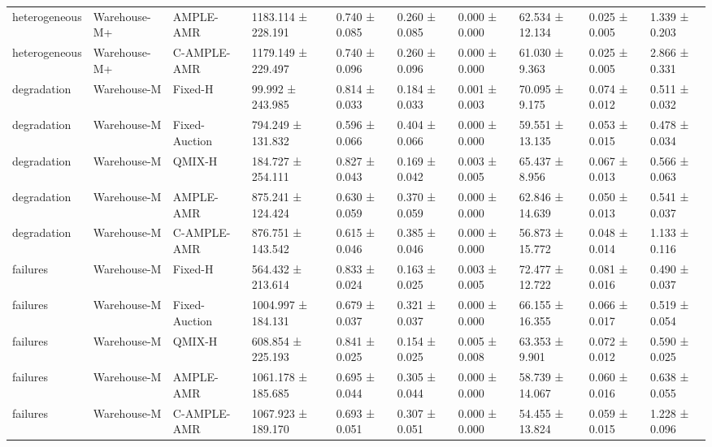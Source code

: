 \begin{tabular}{llllllllll}
heterogeneous & Warehouse-M+ & AMPLE-AMR & 1183.114 ± 228.191 & 0.740 ± 0.085 & 0.260 ± 0.085 & 0.000 ± 0.000 & 62.534 ± 12.134 & 0.025 ± 0.005 & 1.339 ± 0.203 \\
heterogeneous & Warehouse-M+ & C-AMPLE-AMR & 1179.149 ± 229.497 & 0.740 ± 0.096 & 0.260 ± 0.096 & 0.000 ± 0.000 & 61.030 ± 9.363 & 0.025 ± 0.005 & 2.866 ± 0.331 \\
degradation & Warehouse-M & Fixed-H & 99.992 ± 243.985 & 0.814 ± 0.033 & 0.184 ± 0.033 & 0.001 ± 0.003 & 70.095 ± 9.175 & 0.074 ± 0.012 & 0.511 ± 0.032 \\
degradation & Warehouse-M & Fixed-Auction & 794.249 ± 131.832 & 0.596 ± 0.066 & 0.404 ± 0.066 & 0.000 ± 0.000 & 59.551 ± 13.135 & 0.053 ± 0.015 & 0.478 ± 0.034 \\
degradation & Warehouse-M & QMIX-H & 184.727 ± 254.111 & 0.827 ± 0.043 & 0.169 ± 0.042 & 0.003 ± 0.005 & 65.437 ± 8.956 & 0.067 ± 0.013 & 0.566 ± 0.063 \\
degradation & Warehouse-M & AMPLE-AMR & 875.241 ± 124.424 & 0.630 ± 0.059 & 0.370 ± 0.059 & 0.000 ± 0.000 & 62.846 ± 14.639 & 0.050 ± 0.013 & 0.541 ± 0.037 \\
degradation & Warehouse-M & C-AMPLE-AMR & 876.751 ± 143.542 & 0.615 ± 0.046 & 0.385 ± 0.046 & 0.000 ± 0.000 & 56.873 ± 15.772 & 0.048 ± 0.014 & 1.133 ± 0.116 \\
failures & Warehouse-M & Fixed-H & 564.432 ± 213.614 & 0.833 ± 0.024 & 0.163 ± 0.025 & 0.003 ± 0.005 & 72.477 ± 12.722 & 0.081 ± 0.016 & 0.490 ± 0.037 \\
failures & Warehouse-M & Fixed-Auction & 1004.997 ± 184.131 & 0.679 ± 0.037 & 0.321 ± 0.037 & 0.000 ± 0.000 & 66.155 ± 16.355 & 0.066 ± 0.017 & 0.519 ± 0.054 \\
failures & Warehouse-M & QMIX-H & 608.854 ± 225.193 & 0.841 ± 0.025 & 0.154 ± 0.025 & 0.005 ± 0.008 & 63.353 ± 9.901 & 0.072 ± 0.012 & 0.590 ± 0.025 \\
failures & Warehouse-M & AMPLE-AMR & 1061.178 ± 185.685 & 0.695 ± 0.044 & 0.305 ± 0.044 & 0.000 ± 0.000 & 58.739 ± 14.067 & 0.060 ± 0.016 & 0.638 ± 0.055 \\
failures & Warehouse-M & C-AMPLE-AMR & 1067.923 ± 189.170 & 0.693 ± 0.051 & 0.307 ± 0.051 & 0.000 ± 0.000 & 54.455 ± 13.824 & 0.059 ± 0.015 & 1.228 ± 0.096 \\
\bottomrule
\end{tabular}

